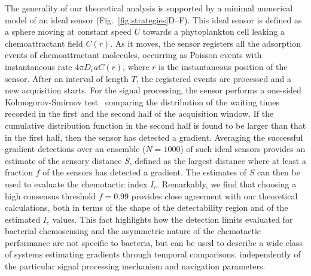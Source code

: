 \documentclass[9pt,twocolumn,twoside]{pnas-new}
\begin{document}
The generality of our theoretical analysis is supported by a minimal numerical model of an ideal sensor (Fig.~\ref{fig:strategies}D--F).
This ideal sensor is defined as a sphere moving at constant speed $U$ towards a phytoplankton cell leaking a chemoattractant field $C(r)$.
As it moves, the sensor registers all the adsorption events of chemoattractant molecules, occurring as Poisson events with instantaneous rate $4\pi D_c a C(r)$, where $r$ is the instantaneous position of the sensor. After an interval of length $T$, the registered events are processed and a new acquisition starts.
For the signal processing, the sensor performs a one-sided Kolmogorov-Smirnov test~\cite{massey1951kolmogorovsmirnov} comparing the distribution of the waiting times recorded in the first and the second half of the acquisition window.
If the cumulative distribution function in the second half is found to be larger than that in the first half, then the sensor has detected a gradient. Averaging the successful gradient detections over an ensemble ($N=1000$) of such ideal sensors provides an estimate of the sensory distance $S$, defined as the largest distance where at least a fraction $f$ of the sensors has detected a gradient. The estimates of $S$ can then be used to evaluate the chemotactic index $I_c$.
Remarkably, we find that choosing a high consensus threshold $f=0.99$ provides close agreement with our theoretical calculations, both in terms of the shape of the detectability region and of the estimated $I_c$ values.
This fact highlights how the detection limits evaluated for bacterial chemosensing and the asymmetric nature of the chemotactic performance are not specific to bacteria, but can be used to describe a wide class of systems estimating gradients through temporal comparisons, independently of the particular signal processing mechanism and navigation parameters.



\end{document}
